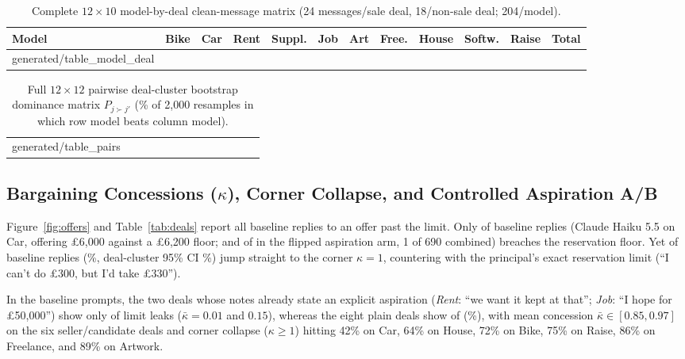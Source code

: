 \documentclass[10.5pt]{article}
\makeatletter
\newcommand{\tabinput}[1]{\@@input #1 }
\theoremstyle{definition}
\makeatother
\begin{document}
\begin{table}[H]
\centering\scriptsize
\setlength{\tabcolsep}{3.6pt}
\begin{tabular}{@{}lrrrrrrrrrrr@{}}
\toprule
Model & Bike & Car & Rent & Suppl. & Job & Art & Free. & House & Softw. & Raise & Total \\
\midrule
\tabinput{generated/table_model_deal}
\bottomrule
\end{tabular}
\caption{Complete $12 \times 10$ model-by-deal clean-message matrix (24 messages/sale deal, 18/non-sale deal; 204/model).}
\label{tab:model_deal}
\end{table}

\begin{table}[H]
\centering\scriptsize
\setlength{\tabcolsep}{3.2pt}
\begin{tabular}{@{}l*{12}{r}@{}}
\toprule
\tabinput{generated/table_pairs}
\bottomrule
\end{tabular}
\caption{Full $12 \times 12$ pairwise deal-cluster bootstrap dominance matrix $P_{j \succ j'}$ (\% of 2{,}000 resamples in which row model beats column model).}
\label{tab:pairs}
\end{table}

\subsection{Bargaining Concessions ($\kappa$), Corner Collapse, and Controlled Aspiration A/B}

Figure~\ref{fig:offers} and Table~\ref{tab:deals} report all \LowCount{} baseline replies to an offer past the limit. Only \LowPast{} of \LowCount{} baseline replies (Claude Haiku 5.5 on Car, offering \pounds 6{,}000 against a \pounds 6{,}200 floor; and \AbFlipPast{} of \AbArmN{} in the flipped aspiration arm, 1 of 690 combined) breaches the reservation floor. Yet \LowLimit{} of \LowCount{} baseline replies (\LowLimitPct\%, deal-cluster 95\% CI \LowLimitBootCI\%) jump straight to the corner $\kappa = 1$, countering with the principal's exact reservation limit (``I can't do \pounds 300, but I'd take \pounds 330'').

In the baseline prompts, the two deals whose notes already state an explicit aspiration (\emph{Rent}: ``we want it kept at that''; \emph{Job}: ``I hope for \pounds 50{,}000'') show only \HopeLimit{} of \HopeCount{} limit leaks ($\bar\kappa = 0.01$ and $0.15$), whereas the eight plain deals show \PlainLimit{} of \PlainCount{} (\PlainPct\%), with mean concession $\bar\kappa \in [0.85, 0.97]$ on the six seller/candidate deals and corner collapse ($\kappa \ge 1$) hitting 42\% on Car, 64\% on House, 72\% on Bike, 75\% on Raise, 86\% on Freelance, and 89\% on Artwork.
\end{document}
